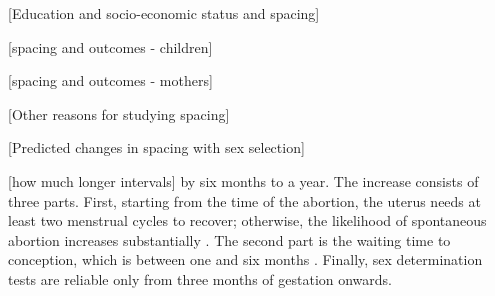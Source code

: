 [Education and socio-economic status and spacing]





[spacing and outcomes - children]

[spacing and outcomes - mothers]


[Other reasons for studying spacing]


[Predicted changes in spacing with sex selection]


[how much longer intervals]
 by six months to a year.
The increase consists of three parts.
First, starting from the time of the abortion, the uterus needs at 
least two menstrual cycles to recover;  otherwise, the likelihood 
of spontaneous abortion increases substantially \citep{zhou00b}.
The second part is the waiting time to conception, which is between 
one and six months \citep{Wang2003}.
Finally, sex determination tests are reliable only from three months 
of gestation onwards.

 
